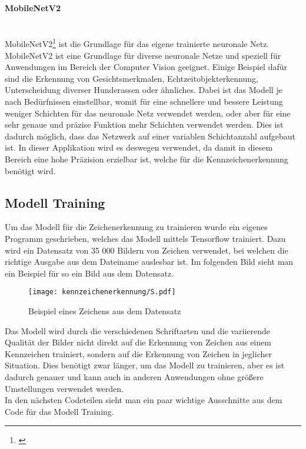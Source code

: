 \paragraph{MobileNetV2}\mbox{}\\
MobileNetV2\footnote{\cite{MobileNet}} ist die Grundlage für das eigene trainierte neuronale Netz. MobileNetV2 ist eine Grundlage für diverse neuronale Netze und speziell für Anwendungen im Bereich der Computer Vision 
geeignet. Einige Beispiel dafür sind die Erkennung von Gesichtsmerkmalen, Echtzeitobjekterkennung, Unterscheidung diverser Hunderassen oder ähnliches. Dabei ist das Modell je nach Bedürfnissen 
einstellbar, womit für eine schnellere und bessere Leistung weniger Schichten für das neuronale Netz verwendet werden, oder aber für eine sehr genaue und präzise Funktion mehr Schichten verwendet werden. 
Dies ist dadurch möglich, dass das Netzwerk auf einer variablen Schichtanzahl aufgebaut ist. In dieser Applikation wird es deswegen verwendet, da damit in diesem Bereich eine hohe Präzision erzielbar ist, 
welche für die Kennzeichenerkennung benötigt wird.

\subsection{Modell Training}
Um das Modell für die Zeichenerkennung zu trainieren wurde ein eigenes Programm geschrieben, welches das Modell mittels Tensorflow trainiert. 
Dazu wird ein Datensatz von 35 000 Bildern von Zeichen verwendet, bei welchen die richtige Ausgabe aus dem Dateiname auslesbar ist. 
Im folgenden Bild sieht man ein Beispiel für so ein Bild aus dem Datensatz.

\begin{figure}[H]
    \centering
    \texttt{[image: kennzeichenerkennung/S.pdf]}
    \caption{Beispiel eines Zeichens aus dem Datensatz}
\end{figure}

Das Modell wird durch die verschiedenen Schriftarten und die variierende Qualität der Bilder nicht direkt auf die Erkennung von Zeichen aus 
einem Kennzeichen trainiert, sondern auf die Erkennung von Zeichen in jeglicher Situation. Dies benötigt zwar länger, um das Modell zu trainieren, 
aber es ist dadurch genauer und kann auch in anderen Anwendungen ohne größere Umstellungen verwendet werden.\\

In den nächsten Codeteilen sieht man ein paar wichtige Ausschnitte aus dem Code für das Modell Training.


